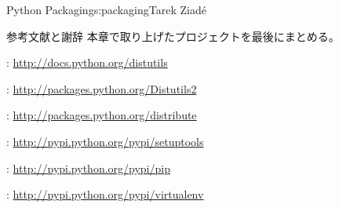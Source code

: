 \begin{aosachapter}{Python Packaging}{s:packaging}{Tarek Ziad\'{e}}
\begin{aosasect1}{参考文献と謝辞}
本章で取り上げたプロジェクトを最後にまとめる。

\begin{aosaitemize}
  \item {}: \url{http://docs.python.org/distutils}
  \item {}: \url{http://packages.python.org/Distutils2}
  \item {}: \url{http://packages.python.org/distribute}
  \item {}: \url{http://pypi.python.org/pypi/setuptools}
  \item {}: \url{http://pypi.python.org/pypi/pip}
  \item {}: \url{http://pypi.python.org/pypi/virtualenv}
\end{aosaitemize}

\end{aosasect1}

\end{aosachapter}

